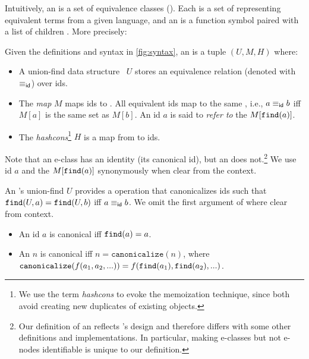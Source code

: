 Intuitively,
  an \egraph is a set of equivalence classes (\textit{\eclasses}).
Each \eclass is a set of \textit{\enodes} representing equivalent terms from a given language,
  and an \enode is a function symbol paired with a list of children \eclasses.
More precisely:

\begin{definition}
  \label{def:egraph}

  Given the definitions and syntax in \autoref{fig:syntax},
  an \textit{\egraph} is a tuple $(U, M, H)$ where:
  \begin{itemize}
    \item
    A union-find data structure~\cite{unionfind} $U$
      stores an equivalence relation (denoted with $\equiv_{\sf id}$)
      over \eclass ids.

    \item
    The \textit{\eclass map} $M$ maps \eclass ids to \eclasses.
    All equivalent \eclass ids map to the same \eclass, i.e.,
      $a \equiv_{\sf id} b$ iff $M[a]$ is the same set as $M[b]$.
    An \eclass id $a$ is said to \textit{refer to} the \eclass $M[\texttt{find}(a)]$.

    \item The \textit{hashcons}\footnote{
      We use the term \textit{hashcons} to evoke the memoization technique,
      since both avoid creating new duplicates of existing objects.
    }
    $H$ is a map from \enodes to \eclass ids.
  \end{itemize}


  Note that an e-class has an identity
   (its canonical \eclass id),
   but an \enode does not.\footnote{
    Our definition of an \egraph reflects \egg's design
      and therefore differs with some other \egraph definitions and implementations.
    In particular, making e-classes but not e-nodes identifiable is unique to
      our definition.
  }
  We use \eclass id $a$ and the \eclass $M[\texttt{find}(a)]$ synonymously when clear from the context.

\end{definition}

\begin{definition}[Canonicalization]
    An \egraph's union-find $U$ provides a \find operation that canonicalizes \eclass ids
      such that ${\texttt{find}(U, a) = \texttt{find}(U, b)}$ iff ${a \equiv_{\sf id} b}$.
    We omit the first argument of \find where clear from context.
    \begin{itemize}
      \item An \eclass id $a$ is canonical iff $\texttt{find}(a) = a$.
      \item \raggedright
            An \enode $n$ is canonical iff $n = \texttt{canonicalize}(n)$,
            where ${\texttt{canonicalize}(f(a_{1}, a_{2}, ...)) = f(\texttt{find}(a_{1}), \texttt{find}(a_{2}), ...)}$.
    \end{itemize}
\end{definition}

